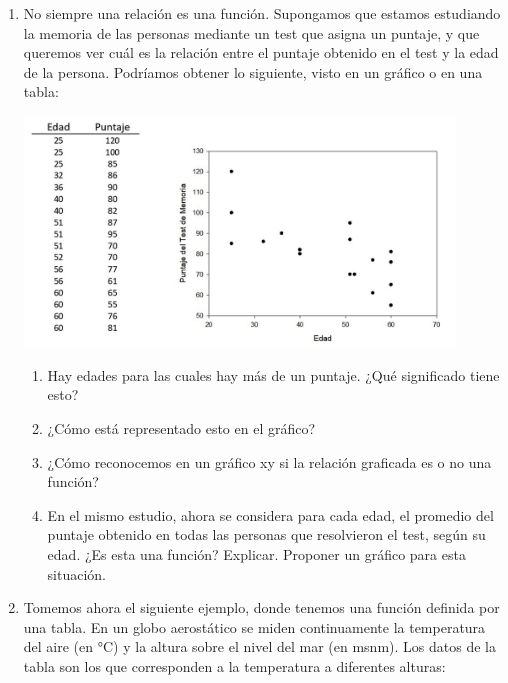 \documentclass[12pt]{article}
\theoremstyle{definition}
\begin{document}
\begin{enumerate}
\item No siempre una relación es una función. Supongamos que estamos estudiando la memoria de las personas mediante un test que asigna un puntaje, y que queremos ver cuál es la relación entre el puntaje obtenido en el test y la edad de la persona. Podríamos obtener lo siguiente, visto en un gráfico o en una tabla:
\begin{center} 
\includegraphics[width=0.9\textwidth]{tp2_fig4.jpg} 
\end{center}
\begin{enumerate} [leftmargin=2cm]
\item Hay edades para las cuales hay más de un puntaje. ¿Qué significado tiene esto? 
\item ¿Cómo está representado esto en el gráfico?
\item ¿Cómo reconocemos en un gráfico xy si la relación graficada es o no una función? 
\item  En el mismo estudio, ahora se considera para cada edad, el promedio del puntaje obtenido en todas las personas que resolvieron el test, según su edad. ¿Es esta una función? Explicar. Proponer un gráfico para esta situación.
\end{enumerate}

\item Tomemos ahora el siguiente ejemplo, donde tenemos una función definida por una tabla.  En un globo aerostático se miden continuamente la temperatura del aire (en °C) y la altura sobre el nivel del mar (en msnm). Los datos de la tabla son los que corresponden a la temperatura a diferentes alturas:\\


\end{enumerate}
\end{document}
